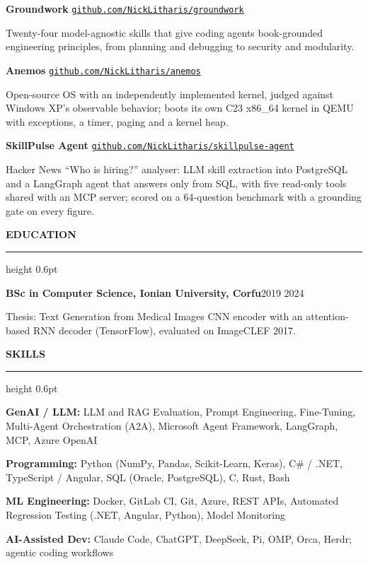 \documentclass[11pt,a4paper]{article}
\newcommand{\cvsection}[1]{%
  \par\vspace{7.0pt}%
  {\headingfont\bfseries\MakeUppercase{#1}}\par
  \vspace{2.2pt}%
  \hrule height 0.6pt%
  \vspace{7.1pt}%
}
\newcommand{\plainentry}[2]{%
  \par\noindent\textbf{#1}\hfill #2\par
}
\newcommand{\project}[2]{%
  \par\vspace{0.5pt}%
  \noindent\textbf{#1} \textemdash{} \href{https://#2}{\texttt{#2}}\par
}
\begin{document}
\vspace{3.5pt}\project{Groundwork}{github.com/NickLitharis/groundwork}
Twenty-four model-agnostic skills that give coding agents book-grounded engineering principles, from planning and debugging to security and modularity.

\vspace{3.5pt}\project{Anemos}{github.com/NickLitharis/anemos}
Open-source OS with an independently implemented kernel, judged against Windows XP's observable behavior; boots its own C23 x86\_64 kernel in QEMU with exceptions, a timer, paging and a kernel heap.

\vspace{3.5pt}\project{SkillPulse Agent}{github.com/NickLitharis/skillpulse-agent}
Hacker News ``Who is hiring?'' analyser: LLM skill extraction into PostgreSQL and a LangGraph agent that answers only from SQL, with five read-only tools shared with an MCP server; scored on a 64-question benchmark with a grounding gate on every figure.

\cvsection{Education}
\plainentry{BSc in Computer Science, Ionian University, Corfu}{2019 \textendash{} 2024}
Thesis: Text Generation from Medical Images \textemdash{} CNN encoder with an attention-based RNN decoder (TensorFlow), evaluated on ImageCLEF 2017.

\cvsection{Skills}
{\small
\textbf{GenAI / LLM:} LLM and RAG Evaluation, Prompt Engineering, Fine-Tuning, Multi-Agent Orchestration (A2A), Microsoft Agent Framework, LangGraph, MCP, Azure OpenAI\par
\textbf{Programming:} Python (NumPy, Pandas, Scikit-Learn, Keras), C\# / .NET, TypeScript / Angular, SQL (Oracle, PostgreSQL), C, Rust, Bash\par
\textbf{ML Engineering:} Docker, GitLab CI, Git, Azure, REST APIs, Automated Regression Testing (.NET, Angular, Python), Model Monitoring\par
\textbf{AI-Assisted Dev:} Claude Code, ChatGPT, DeepSeek, Pi, OMP, Orca, Herdr; agentic coding workflows\par
}
\end{document}
